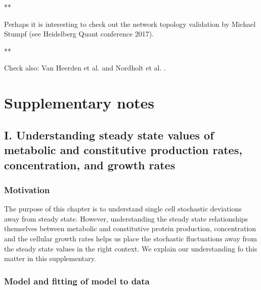 **

Perhaps it is interesting to check out the network topology validation by Michael Stumpf (see Heidelberg Quant conference 2017). 

**


Check also:
Van Heerden et al. \cite{VanHeerden2017}
and
Nordholt et al. \cite{Nordholt2017}.


\clearpage
\FloatBarrier
\section*{Supplementary notes}

\subsection*{I. Understanding steady state values of metabolic and constitutive production rates, concentration, and growth rates}

\subsubsection{Motivation}
The purpose of this chapter is to understand 
single cell stochastic deviations away from steady state. 
%
However, understanding the steady state relationships themselves between metabolic and constitutive protein production, concentration and the cellular growth rates helps us place the stochastic fluctuations away from the steady state values in the right context.
%
We explain our understanding fo this matter in this supplementary. %

\subsubsection{Model and fitting of model to data}

